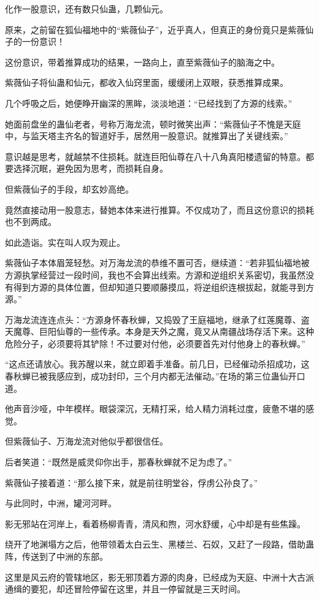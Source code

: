 \begin{this_body}
化作一股意识，还有数只仙蛊，几颗仙元。

原来，之前留在狐仙福地中的“紫薇仙子”，近乎真人，但真正的身份竟只是紫薇仙子的一份意识！

这份意识，带着推算成功的结果，一路向上，直至紫薇仙子的脑海之中。

紫薇仙子将仙蛊和仙元，都收入仙窍里面，缓缓闭上双眼，获悉推算成果。

几个呼吸之后，她便睁开幽深的黑眸，淡淡地道：“已经找到了方源的线索。”

她面前盘坐的蛊仙老者，号称万海龙流，顿时微笑出声：“紫薇仙子不愧是天庭中，与监天塔主齐名的智道好手，居然用一股意识。就推算出了关键线索。”

意识越是思考，就越禁不住损耗。就连巨阳仙尊在八十八角真阳楼遗留的特意。都要选择沉眠，避免因为思考，而损耗自身。

但紫薇仙子的手段，却玄妙高绝。

竟然直接动用一股意志，替她本体来进行推算。不仅成功了，而且这份意识的损耗也不到两成。

如此造诣。实在叫人叹为观止。

紫薇仙子本体眉笼轻愁。对万海龙流的恭维不置可否，继续道：“若非狐仙福地被方源执掌经营过一段时间，我也不会算出线索。方源和逆组织关系密切，我虽然没有得到方源的具体位置，但却知道只要顺藤摸瓜，将逆组织连根拔起，就能寻到方源。”

万海龙流连连点头：“方源身怀春秋蝉，又捣毁了王庭福地，继承了红莲魔尊、盗天魔尊、巨阳仙尊的一些传承。本身是天外之魔，竟又从南疆战场存活下来。这种危险分子，必须要将其铲除！不过要对付他，必须要首先对付他身上的春秋蝉。”

“这点还请放心。我苏醒以来，就立即着手准备。前几日，已经催动杀招成功，这春秋蝉已被我感应到，成功封印，三个月内都无法催动。”在场的第三位蛊仙开口道。

他声音沙哑，中年模样。眼袋深沉，无精打采，给人精力消耗过度，疲惫不堪的感觉。

但紫薇仙子、万海龙流对他似乎都很信任。

后者笑道：“既然是威灵仰你出手，那春秋蝉就不足为虑了。”

紫薇仙子接着道：“那么接下来，就是前往明堂谷，俘虏公孙良了。”

与此同时，中洲，罐河河畔。

影无邪站在河岸上，看着杨柳青青，清风和煦，河水舒缓，心中却是有些焦躁。

绕开了地渊塌方之后，他带领着太白云生、黑楼兰、石奴，又赶了一段路，借助蛊阵，传送到了中洲的东部。

这里是风云府的管辖地区，影无邪顶着方源的肉身，已经成为天庭、中洲十大古派通缉的要犯，却还冒险停留在这里，并且一停留就是三天时间。


\end{this_body}
